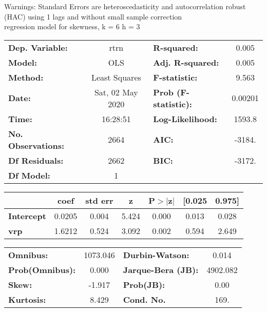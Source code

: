 Warnings: \newline
 [1] Standard Errors are heteroscedasticity and autocorrelation robust (HAC) using 1 lags and without small sample correction\\ 

regression model for skewness, k = 6 h = 3\begin{center}
\begin{tabular}{lclc}
\toprule
\textbf{Dep. Variable:}    &       rtrn       & \textbf{  R-squared:         } &     0.005   \\
\textbf{Model:}            &       OLS        & \textbf{  Adj. R-squared:    } &     0.005   \\
\textbf{Method:}           &  Least Squares   & \textbf{  F-statistic:       } &     9.563   \\
\textbf{Date:}             & Sat, 02 May 2020 & \textbf{  Prob (F-statistic):} &  0.00201    \\
\textbf{Time:}             &     16:28:51     & \textbf{  Log-Likelihood:    } &    1593.8   \\
\textbf{No. Observations:} &        2664      & \textbf{  AIC:               } &    -3184.   \\
\textbf{Df Residuals:}     &        2662      & \textbf{  BIC:               } &    -3172.   \\
\textbf{Df Model:}         &           1      & \textbf{                     } &             \\
\bottomrule
\end{tabular}
\begin{tabular}{lcccccc}
                   & \textbf{coef} & \textbf{std err} & \textbf{z} & \textbf{P$> |$z$|$} & \textbf{[0.025} & \textbf{0.975]}  \\
\midrule
\textbf{Intercept} &       0.0205  &        0.004     &     5.424  &         0.000        &        0.013    &        0.028     \\
\textbf{vrp}       &       1.6212  &        0.524     &     3.092  &         0.002        &        0.594    &        2.649     \\
\bottomrule
\end{tabular}
\begin{tabular}{lclc}
\textbf{Omnibus:}       & 1073.046 & \textbf{  Durbin-Watson:     } &    0.014  \\
\textbf{Prob(Omnibus):} &   0.000  & \textbf{  Jarque-Bera (JB):  } & 4902.082  \\
\textbf{Skew:}          &  -1.917  & \textbf{  Prob(JB):          } &     0.00  \\
\textbf{Kurtosis:}      &   8.429  & \textbf{  Cond. No.          } &     169.  \\
\bottomrule
\end{tabular}
\end{center}

